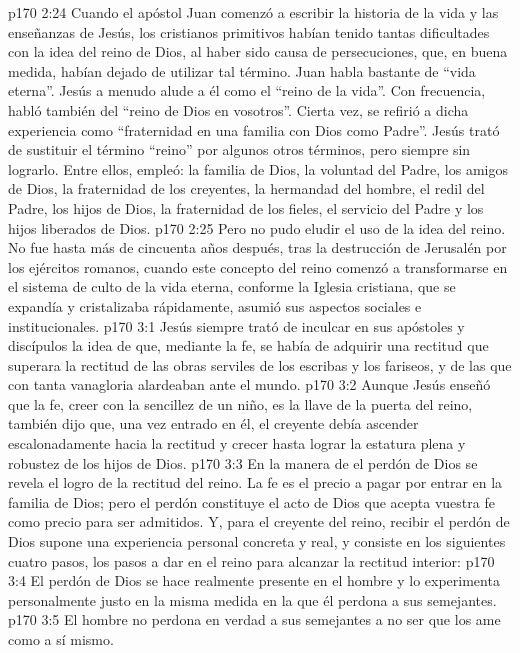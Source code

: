 \vs p170 2:24 Cuando el apóstol Juan comenzó a escribir la historia de la vida y las enseñanzas de Jesús, los cristianos primitivos habían tenido tantas dificultades con la idea del reino de Dios, al haber sido causa de persecuciones, que, en buena medida, habían dejado de utilizar tal término. Juan habla bastante de “vida eterna”. Jesús a menudo alude a él como el “reino de la vida”. Con frecuencia, habló también del “reino de Dios en vosotros”. Cierta vez, se refirió a dicha experiencia como “fraternidad en una familia con Dios como Padre”. Jesús trató de sustituir el término “reino” por algunos otros términos, pero siempre sin lograrlo. Entre ellos, empleó: la familia de Dios, la voluntad del Padre, los amigos de Dios, la fraternidad de los creyentes, la hermandad del hombre, el redil del Padre, los hijos de Dios, la fraternidad de los fieles, el servicio del Padre y los hijos liberados de Dios.
\vs p170 2:25 Pero no pudo eludir el uso de la idea del reino. No fue hasta más de cincuenta años después, tras la destrucción de Jerusalén por los ejércitos romanos, cuando este concepto del reino comenzó a transformarse en el sistema de culto de la vida eterna, conforme la Iglesia cristiana, que se expandía y cristalizaba rápidamente, asumió sus aspectos sociales e institucionales.
\vs p170 3:1 Jesús siempre trató de inculcar en sus apóstoles y discípulos la idea de que, mediante la fe, se había de adquirir una rectitud que superara la rectitud de las obras serviles de los escribas y los fariseos, y de las que con tanta vanagloria alardeaban ante el mundo.
\vs p170 3:2 Aunque Jesús enseñó que la fe, creer con la sencillez de un niño, es la llave de la puerta del reino, también dijo que, una vez entrado en él, el creyente debía ascender escalonadamente hacia la rectitud y crecer hasta lograr la estatura plena y robustez de los hijos de Dios.
\vs p170 3:3 En la manera de  el perdón de Dios se revela el logro de la rectitud del reino. La fe es el precio a pagar por entrar en la familia de Dios; pero el perdón constituye el acto de Dios que acepta vuestra fe como precio para ser admitidos. Y, para el creyente del reino, recibir el perdón de Dios supone una experiencia personal concreta y real, y consiste en los siguientes cuatro pasos, los pasos a dar en el reino para alcanzar la rectitud interior:
\vs p170 3:4 El perdón de Dios se hace realmente presente en el hombre y lo experimenta personalmente justo en la misma medida en la que él perdona a sus semejantes.
\vs p170 3:5 El hombre no perdona en verdad a sus semejantes a no ser que los ame como a sí mismo.
